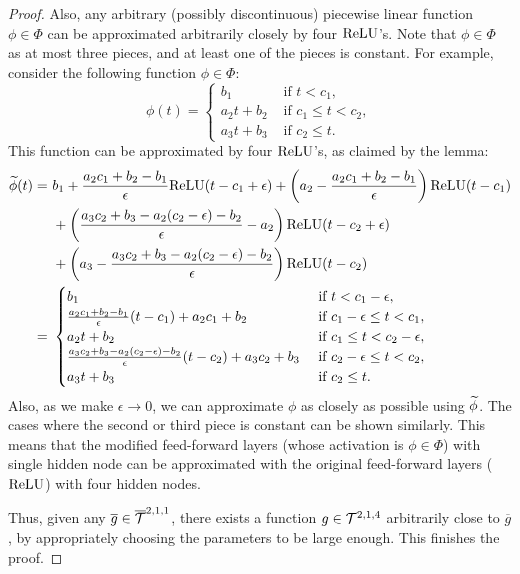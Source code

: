 \begin{proof}
Also, any arbitrary (possibly discontinuous) piecewise linear function $\phi \in \Phi$ can be approximated arbitrarily closely by four ${\rm ReLU}$'s.
Note that $\phi \in \Phi$ as at most three pieces, and at least one of the pieces is constant.
For example, consider the following function $\phi \in \Phi$:
\begin{equation*}
    \phi(t) = 
    \begin{cases}
        b_1 & \text { if } t < c_1,\\
        a_2 t + b_2 & \text { if } c_1 \leq t < c_2,\\
        a_3 t + b_3 & \text { if } c_2 \leq t.
    \end{cases}
\end{equation*}
This function can be approximated by four ${\rm ReLU}$'s, as claimed by the lemma:
\begin{align*}
    \widetilde{\phi}(t) =~&
    b_1 + \frac{a_2 c_1 + b_2 - b_1}{\epsilon} {\rm ReLU}(t-c_1+\epsilon)
    + \left ( a_2 - \frac{a_2 c_1 + b_2 - b_1}{\epsilon} \right ) {\rm ReLU}(t-c_1) \\
    &+ \left ( \frac{a_3 c_2 + b_3 - a_2(c_2 - \epsilon) - b_2}{\epsilon} - a_2 \right ) {\rm ReLU}(t - c_2 + \epsilon)\\
    &+ \left ( a_3 - \frac{a_3 c_2 + b_3 - a_2(c_2 - \epsilon) - b_2}{\epsilon} \right ) {\rm ReLU}(t - c_2)\\
    =~&
    \begin{cases}
        b_1 & \text { if } t < c_1-\epsilon,\\
        \frac{a_2 c_1 + b_2 - b_1}{\epsilon} (t - c_1) + a_2c_1 + b_2 & \text { if } c_1-\epsilon \leq t < c_1,\\
        a_2 t + b_2 & \text { if } c_1 \leq t < c_2-\epsilon,\\
        \frac{a_3 c_2 + b_3 - a_2(c_2 - \epsilon) - b_2}{\epsilon} (t - c_2) + a_3 c_2 + b_3 & \text { if } c_2-\epsilon \leq t < c_2,\\
        a_3 t + b_3 & \text { if } c_2 \leq t.
    \end{cases}
\end{align*}
Also, as we make $\epsilon \rightarrow 0$, we can approximate $\phi$ as closely as possible using $\widetilde{\phi}$. The cases where the second or third piece is constant can be shown similarly. This means that the modified feed-forward layers (whose activation is $\phi \in \Phi$) with single hidden node can be approximated with the original feed-forward layers (${\rm ReLU}$) with four hidden nodes.

Thus, given any $\overline{g} \in \overline{\mathcal{T}}^{2,1,1}$, there exists a function $g \in {\mathcal{T}}^{2,1,4}$ arbitrarily close to $\overline{g}$, by appropriately choosing the parameters to be large enough. This finishes the proof.
\end{proof}

